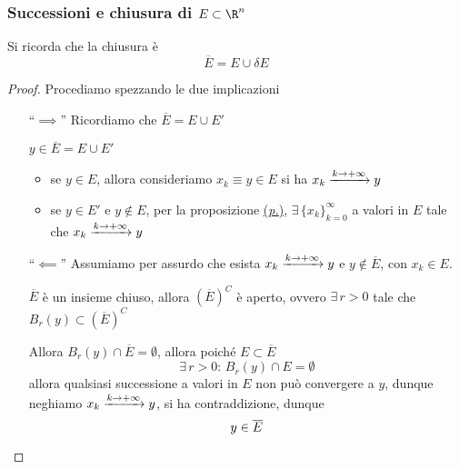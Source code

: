 \subsubsection{Successioni e chiusura di $ E \subset \R^{n} $}

Si ricorda che la chiusura è \[
    \overline{E}=E\cup \delta E
\]

\begin{proof}
    Procediamo spezzando le due implicazioni
    \begin{itemize}
        \item [``$\implies$''] Ricordiamo che $ \overline{E}=E\cup E' $
        
        $ y \in \overline{E}=E\cup E' $
        \begin{itemize}
            \item se $ y \in E $, allora consideriamo $ x_{k}\equiv  y \in E$ si ha $ x_{k} \xrightarrow{k\to +\infty} y \displaystyle $
            \item se $ y \in E' $ e $ y \notin E $, per la proposizione \hyperref[prp:asgdfgdffger]{(\textit{p.})}, $ \exists\, \{x_{k} \}_{k=0}^\infty $ a valori in $ E $ tale che $ x_{k} \xrightarrow{k\to +\infty} y \displaystyle $
        \end{itemize}

        \item [``$\impliedby$''] Assumiamo per assurdo che esista $ x_{k} \xrightarrow{k\to +\infty} y \displaystyle $ e $ y\notin \overline{E} $, con $ x_{k} \in E $.
        
        $ \overline{E} $ è un insieme chiuso, allora $ (\overline{E})^{C} $ è aperto, ovvero $ \exists\,r>0 $ tale che $ B_{r}(y) \subset (\overline{E})^{C}  $

        Allora $ B_{r}(y)\cap \overline{E}=\emptyset $, allora poiché $ E \subset \overline{E} $ \[
            \exists\,r>0:\, B_{r}(y)\cap E = \emptyset 
        \]
        allora qualsiasi successione a valori in $ E $ non può convergere a $ y $, dunque neghiamo $ x_{k} \xrightarrow{k\to +\infty} y \displaystyle $, si ha contraddizione, dunque \[ y \in \overline{E} \qedhere\]
    \end{itemize}
\end{proof}


